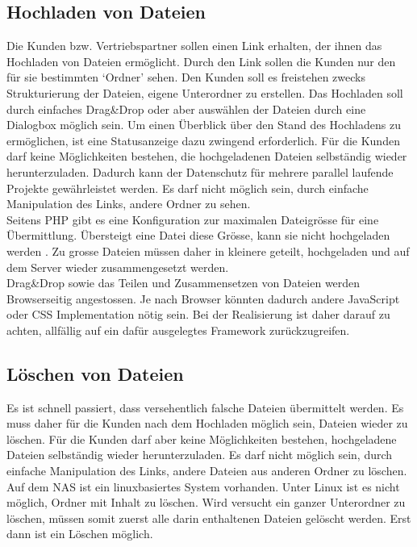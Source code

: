 \subsection{Hochladen von Dateien}
Die Kunden bzw. Vertriebspartner sollen einen Link erhalten, der ihnen das Hochladen von Dateien ermöglicht. Durch den Link sollen die Kunden nur den für sie bestimmten `Ordner' sehen. 
Den Kunden soll es freistehen zwecks Strukturierung der Dateien, eigene Unterordner zu erstellen.
Das Hochladen soll durch einfaches Drag\&Drop oder aber auswählen der Dateien durch eine Dialogbox möglich sein. 
Um einen Überblick über den Stand des Hochladens zu ermöglichen, ist eine Statusanzeige dazu zwingend erforderlich. 
Für die Kunden darf keine Möglichkeiten bestehen, die hochgeladenen Dateien selbständig wieder herunterzuladen. 
Dadurch kann der Datenschutz für mehrere parallel laufende Projekte gewährleistet werden.
Es darf nicht möglich sein, durch einfache Manipulation des Links, andere Ordner zu sehen.  
\\
Seitens PHP gibt es eine Konfiguration zur maximalen Dateigrösse für eine Übermittlung. Übersteigt eine Datei diese Grösse, kann sie nicht hochgeladen werden \cite{PHPpitfalls}. 
Zu grosse Dateien müssen daher in kleinere geteilt, hochgeladen und auf dem Server wieder zusammengesetzt werden.
\\ 
Drag\&Drop sowie das Teilen und Zusammensetzen von Dateien werden Browserseitig angestossen. Je nach Browser könnten dadurch andere JavaScript oder CSS Implementation nötig sein.
Bei der Realisierung ist daher darauf zu achten, allfällig auf ein dafür ausgelegtes Framework zurückzugreifen. 

\subsection{Löschen von Dateien}
Es ist schnell passiert, dass versehentlich falsche Dateien übermittelt werden. 
Es muss daher für die Kunden nach dem Hochladen möglich sein, Dateien wieder zu löschen. 
Für die Kunden darf aber keine Möglichkeiten bestehen, hochgeladene Dateien selbständig wieder herunterzuladen. 
Es darf nicht möglich sein, durch einfache Manipulation des Links, andere Dateien aus anderen Ordner zu löschen.
\\
Auf dem NAS ist ein linuxbasiertes System vorhanden. Unter Linux ist es nicht möglich, Ordner mit Inhalt zu löschen. 
Wird versucht ein ganzer Unterordner zu löschen, müssen somit zuerst alle darin enthaltenen Dateien gelöscht werden. Erst dann ist ein Löschen möglich.

